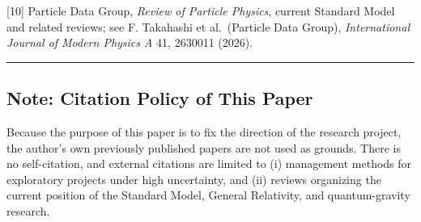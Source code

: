 \documentclass[
  a4paper,
]{article}
\begin{document}
{[}10{]} Particle Data Group, \emph{Review of Particle Physics}, current
Standard Model and related reviews; see F. Takahashi et al.~(Particle
Data Group), \emph{International Journal of Modern Physics A} 41,
2630011 (2026).

\begin{center}\rule{0.5\linewidth}{0.5pt}\end{center}

\subsection{Note: Citation Policy of This
Paper}\label{note-citation-policy-of-this-paper}

Because the purpose of this paper is to fix the direction of the
research project, the author's own previously published papers are not
used as grounds. There is no self-citation, and external citations are
limited to (i) management methods for exploratory projects under high
uncertainty, and (ii) reviews organizing the current position of the
Standard Model, General Relativity, and quantum-gravity research.
\end{document}
